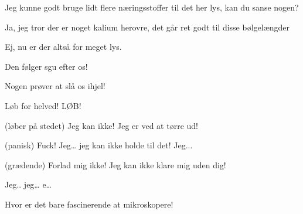 \documentclass[a4paper,11pt]{article}
\begin{document}
\begin{sketch}
 Jeg kunne godt bruge lidt flere næringsstoffer til det her lys, kan du sanse nogen?


 Ja, jeg tror der er noget kalium herovre, det går ret godt til disse bølgelængder




 Ej, nu er der altså for meget lys.




 Den følger sgu efter os!


 Nogen prøver at slå os ihjel!


 Løb for helved! LØB!




 (løber på stedet) Jeg kan ikke! Jeg er ved at tørre ud!


 (panisk) Fuck! Jeg… jeg kan ikke holde til det! Jeg... 


 (grædende) Forlad mig ikke! Jeg kan ikke klare mig uden dig!


 Jeg.. jeg… e…






 Hvor er det bare fascinerende at mikroskopere!



\end{sketch}
\end{document}

